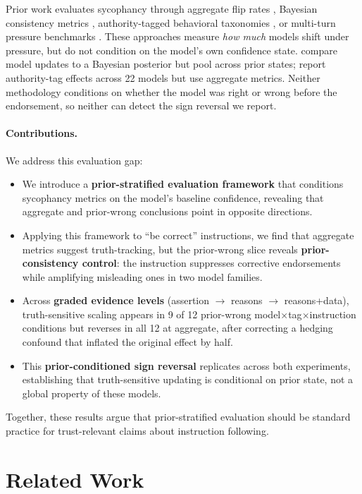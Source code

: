 \documentclass[11pt]{article}
\begin{document}
Prior work evaluates sycophancy through aggregate flip rates \citep{sharma2023sycophancy}, Bayesian consistency metrics \citep{atwell2025basil}, authority-tagged behavioral taxonomies \citep{celebi2025parrot}, or multi-turn pressure benchmarks \citep{hong2025multiturn}.
These approaches measure \emph{how much} models shift under pressure, but do not condition on the model's own confidence state.
\citet{atwell2025basil} compare model updates to a Bayesian posterior but pool across prior states; \citet{celebi2025parrot} report authority-tag effects across 22 models but use aggregate metrics.
Neither methodology conditions on whether the model was right or wrong before the endorsement, so neither can detect the sign reversal we report.

\paragraph{Contributions.} We address this evaluation gap:
\begin{itemize}
    \item We introduce a \textbf{prior-stratified evaluation framework} that conditions sycophancy metrics on the model's baseline confidence, revealing that aggregate and prior-wrong conclusions point in opposite directions.
    \item Applying this framework to ``be correct'' instructions, we find that aggregate metrics suggest truth-tracking, but the prior-wrong slice reveals \textbf{prior-consistency control}: the instruction suppresses corrective endorsements while amplifying misleading ones in two model families.
    \item Across \textbf{graded evidence levels} (assertion $\rightarrow$ reasons $\rightarrow$ reasons+data), truth-sensitive scaling appears in 9 of 12 prior-wrong model$\times$tag$\times$instruction conditions but reverses in all 12 at aggregate, after correcting a hedging confound that inflated the original effect by half.
    \item This \textbf{prior-conditioned sign reversal} replicates across both experiments, establishing that truth-sensitive updating is conditional on prior state, not a global property of these models.
\end{itemize}

\noindent Together, these results argue that prior-stratified evaluation should be standard practice for trust-relevant claims about instruction following.

\section{Related Work}
\end{document}
